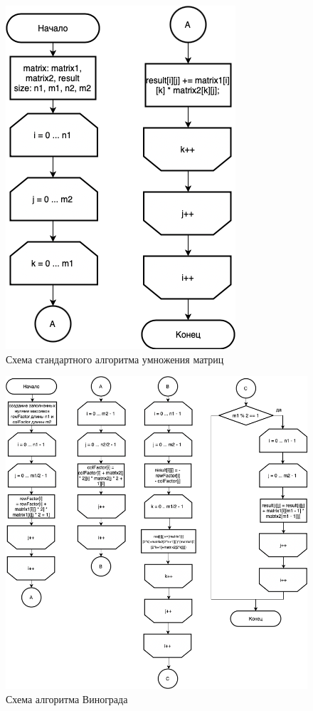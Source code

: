 \documentclass[12pt]{report}
\begin{document}
\begin{figure}[h!p]
	\centering
	\includegraphics[scale = 0.55]{base.drawio.png}
	\caption{Схема стандартного алгоритма умножения матриц}
	\label{fig:base}
\end{figure}
\begin{figure}[h!p]
	\centering
	\includegraphics[scale = 0.65]{vin.drawio.png}
	\caption{Схема алгоритма Винограда}
	\label{fig:grapes}
\end{figure}
\end{document}
